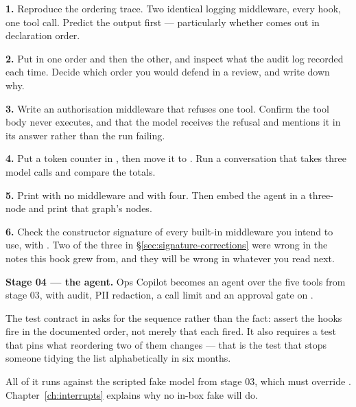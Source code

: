 \begin{exercisebox}
\textbf{1.} Reproduce the ordering trace. Two identical logging middleware, every
hook, one tool call. Predict the output first --- particularly whether
 comes out in declaration order.

\textbf{2.} Put  in one order and then the other, and inspect
what the audit log recorded each time. Decide which order you would defend in a
review, and write down why.

\textbf{3.} Write an authorisation middleware that refuses one tool. Confirm the
tool body never executes, and that the model receives the refusal and mentions it
in its answer rather than the run failing.

\textbf{4.} Put a token counter in , then move it to
. Run a conversation that takes three model calls and compare
the totals.

\textbf{5.} Print  with no middleware and with
four. Then embed the agent in a three-node  and print that
graph's nodes.

\textbf{6.} Check the constructor signature of every built-in middleware you
intend to use, with . Two of the three in
\S\ref{sec:signature-corrections} were wrong in the notes this book grew from,
and they will be wrong in whatever you read next.
\end{exercisebox}

\begin{projectbox}
\textbf{Stage 04 --- the agent.} Ops Copilot becomes an agent over the five tools
from stage 03, with audit, PII redaction, a call limit and an approval gate on
.

The test contract in  asks for the
sequence rather than the fact: assert the hooks fire in the documented order, not
merely that each fired. It also requires a test that pins what reordering two of
them changes --- that is the test that stops someone tidying the list
alphabetically in six months.

All of it runs against the scripted fake model from stage 03, which must override
. Chapter~\ref{ch:interrupts} explains why no in-box fake will
do.
\end{projectbox}
